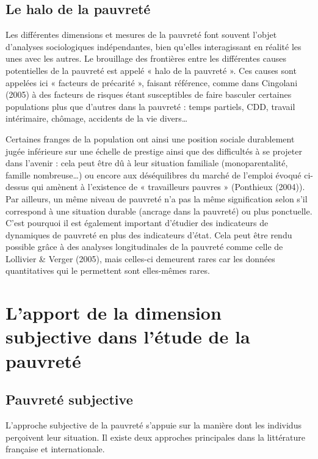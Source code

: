 \documentclass[12pt,a4paper]{reedthesis}
\begin{document}
\hypertarget{le-halo-de-la-pauvretuxe9}{%
\subsection{Le halo de la pauvreté}\label{le-halo-de-la-pauvretuxe9}}

Les différentes dimensions et mesures de la pauvreté font souvent l'objet d'analyses sociologiques indépendantes, bien qu'elles interagissant en réalité les unes avec les autres. Le brouillage des frontières entre les différentes causes potentielles de la pauvreté est appelé « halo de la pauvreté ». Ces causes sont appelées ici « facteurs de précarité », faisant référence, comme dans Cingolani (2005) à des facteurs de risques étant susceptibles de faire basculer certaines populations plus que d'autres dans la pauvreté : temps partiels, CDD, travail intérimaire, chômage, accidents de la vie divers\ldots{}

Certaines franges de la population ont ainsi une position sociale durablement jugée inférieure sur une échelle de prestige ainsi que des difficultés à se projeter dans l'avenir : cela peut être dû à leur situation familiale (monoparentalité, famille nombreuse\ldots) ou encore aux déséquilibres du marché de l'emploi évoqué ci-dessus qui amènent à l'existence de « travailleurs pauvres » (Ponthieux (2004)). Par ailleurs, un même niveau de pauvreté n'a pas la même signification selon s'il correspond à une situation durable (ancrage dans la pauvreté) ou plus ponctuelle. C'est pourquoi il est également important d'étudier des indicateurs de dynamiques de pauvreté en plus des indicateurs d'état. Cela peut être rendu possible grâce à des analyses longitudinales de la pauvreté comme celle de Lollivier \& Verger (2005), mais celles-ci demeurent rares car les données quantitatives qui le permettent sont elles-mêmes rares.

\hypertarget{sec:pauvsubj}{%
\section{L'apport de la dimension subjective dans l'étude de la pauvreté}\label{sec:pauvsubj}}

\hypertarget{pauvretuxe9-subjective}{%
\subsection{Pauvreté subjective}\label{pauvretuxe9-subjective}}

L'approche subjective de la pauvreté s'appuie sur la manière dont les individus perçoivent leur situation. Il existe deux approches principales dans la littérature française et internationale.
\end{document}
